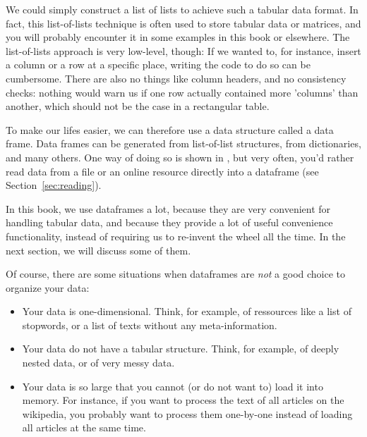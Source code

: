 We could simply construct a list of lists to achieve such a tabular data format.
In fact, this list-of-lists technique is often used to store tabular data or matrices, and you will probably encounter it in some examples in this book or elsewhere. The list-of-lists approach is very low-level, though: If we wanted to, for instance, insert a column or a row at a specific place, writing the code to do so can be cumbersome. There are also no things like column headers, and no consistency checks: nothing would warn us if one row actually contained more 'columns' than another, which should not be the case in a rectangular table.

To make our lifes easier, we can therefore use a data structure called a data frame. 
Data frames can be generated from list-of-list structures, from dictionaries, and many others.
One way of doing so is shown in , but very often, you'd rather read data from a file or an online resource directly into a dataframe (see Section~\ref{sec:reading}).


In this book, we use dataframes a lot, because they are very convenient for handling tabular data, and because they provide a lot of useful convenience functionality, instead of requiring us to re-invent the wheel all the time. In the next section, we will discuss some of them.

Of course, there are some situations when dataframes are \emph{not} a good choice to organize your data:
\begin{itemize}
\item Your data is one-dimensional. Think, for example, of ressources like a list of stopwords, or a list of texts without any meta-information.
\item Your data do not have a tabular structure. Think, for example, of deeply nested data, or of very messy data.
\item Your data is so large that you cannot (or do not want to) load it into memory. For instance, if you want to process the text of all articles on the wikipedia, you probably want to process them one-by-one instead of loading all articles at the same time.
\end{itemize}


